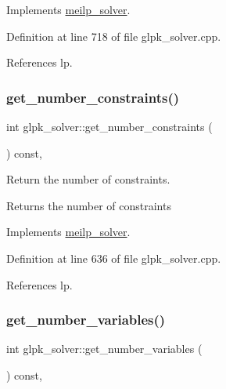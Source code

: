 Implements \hyperlink{classmeilp__solver_a8bed22d1f0a2a87868f46089c57a6add}{meilp\+\_\+solver}.



Definition at line 718 of file glpk\+\_\+solver.\+cpp.



References lp.

\mbox{\label{classglpk__solver_ab92636d941e8052c7a24f8fc7de12eb8}} 
\subsubsection{\texorpdfstring{get\+\_\+number\+\_\+constraints()}{get\_number\_constraints()}}
{\footnotesize\ttfamily int glpk\+\_\+solver\+::get\+\_\+number\+\_\+constraints (\begin{DoxyParamCaption}{ }\end{DoxyParamCaption}) const\hspace{0.3cm}{\ttfamily [override]}, {\ttfamily [virtual]}}



Return the number of constraints. 

\begin{DoxyReturn}{Returns}
the number of constraints 
\end{DoxyReturn}


Implements \hyperlink{classmeilp__solver_a0045d972eeb07fca06d9ac59ef802a86}{meilp\+\_\+solver}.



Definition at line 636 of file glpk\+\_\+solver.\+cpp.



References lp.

\mbox{\label{classglpk__solver_a331a217a8d51011ad68bfd97c6844778}} 
\subsubsection{\texorpdfstring{get\+\_\+number\+\_\+variables()}{get\_number\_variables()}}
{\footnotesize\ttfamily int glpk\+\_\+solver\+::get\+\_\+number\+\_\+variables (\begin{DoxyParamCaption}{ }\end{DoxyParamCaption}) const\hspace{0.3cm}{\ttfamily [override]}, {\ttfamily [virtual]}}



